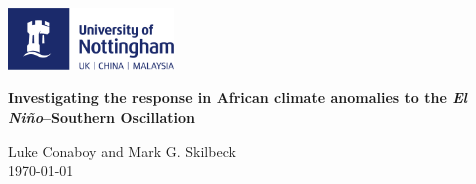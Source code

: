 \documentclass[12pt, twocolumn, x11names]{article}
\newcommand{\elnino}[0]{\emph{El Ni\~no}}
\newcommand{\nina}[0]{\emph{La Ni\~na}}
\begin{document}


\begin{titlepage}
  \begin{center}
    \includegraphics[width=0.33\textwidth]{figures/uon_logo}
    \vspace{3cm}
    
    {\Huge \bfseries Investigating the response in African climate anomalies to the \elnino{}--Southern Oscillation \par} 
      \vspace{2cm}
      {\Large Luke Conaboy and Mark G. Skilbeck} \\
      \vspace{1cm} {\Large\today} \vspace{2cm}
    \begin{abstract}
      We have explored the use of remote sensing methods in examining
      the effects of \elnino{}, \nina{} and other ocean-atmosphere
      systems on cloud coverage and vegetation growth in South and
      East Africa. We find that, generally, cloud coverage and
      vegetation growth is anticorrelated with \elnino{} events in
      South Africa and correlated with \elnino{} events in East
      Africa. We also note an interesting dependence on Indian Ocean
      sea surface temperature anomalies.
    \end{abstract}
  \end{center}
\end{titlepage}

\newpage
\thispagestyle{empty}
\mbox{}

\newpage
{}
\end{document}
